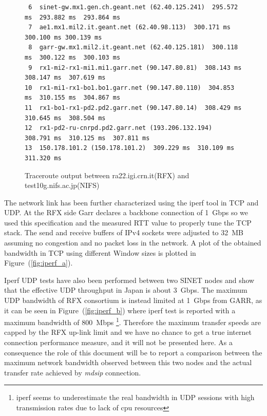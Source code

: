 \documentclass[10pt,a4paper]{article}
\begin{document}
\begin{figure}[htbp!]
\begin{minipage}{.5\textwidth}
{\begin{verbatim}
 6  sinet-gw.mx1.gen.ch.geant.net (62.40.125.241)  295.572 ms  293.882 ms  293.864 ms
 7  ae1.mx1.mil2.it.geant.net (62.40.98.113)  300.171 ms  300.100 ms 300.139 ms
 8  garr-gw.mx1.mil2.it.geant.net (62.40.125.181)  300.118 ms  300.122 ms  300.103 ms
 9  rx1-mi2-rx1-mi1.mi1.garr.net (90.147.80.81)  308.143 ms  308.147 ms  307.619 ms
10  rx1-mi1-rx1-bo1.bo1.garr.net (90.147.80.110)  304.853 ms  310.155 ms  304.867 ms
11  rx1-bo1-rx1-pd2.pd2.garr.net (90.147.80.14)  308.429 ms  310.645 ms  308.504 ms
12  rx1-pd2-ru-cnrpd.pd2.garr.net (193.206.132.194)  308.791 ms  310.125 ms  307.811 ms
13  150.178.101.2 (150.178.101.2)  309.229 ms  310.109 ms  311.320 ms
\end{verbatim} }
\end{minipage} 
\caption{Traceroute output between ra22.igi.crn.it(RFX) and test10g.nifs.ac.jp(NIFS) }  
\label{fig:hops}
\end{figure}

The network link has been further characterized using the iperf tool in TCP and UDP. 
At the RFX side Garr declares a backbone connection of 1~Gbps so we used this specification and the measured RTT value to properly tune the TCP stack.
The send and receive buffers of IPv4 sockets were adjusted to 32~MB assuming no congestion and no packet loss in the network. %
A plot of the obtained bandwidth in TCP using different Window sizes is plotted in Figure~(\ref{fig:iperf_a}).

Iperf UDP tests have also been performed between two SINET nodes and show that the effective UDP throughput in Japan is about 3~Gbps.
The maximum UDP bandwidth of RFX consortium is instead limited at 1~Gbps from GARR, as it can be seen in Figure~(\ref{fig:iperf_b}) where iperf test is reported with a maximum bandwidth of 800~Mbps
\footnote{iperf seems to underestimate the real bandwidth in UDP sessions with high transmission rates due to lack of cpu resources}.
Therefore the maximum transfer speeds are capped by the RFX up-link limit and we have no chance to get a true internet connection performance measure, and it will not be presented here.
As a consequence the role of this document will be to report a comparison between the maximum network bandwidth observed between this two nodes and the actual transfer rate achieved by \emph{mdsip} connection.
\end{document}
